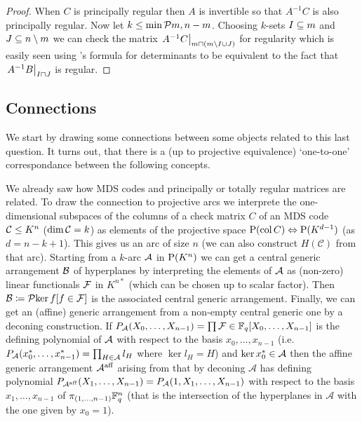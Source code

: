 \begin{proof}
    When $C$ is principally regular then $A$ is invertible so that $A^{-1}C$ is also principally regular. Now let $k\leq \min\set{m,n-m}$. Choosing $k$-sets $I\subseteq m$ and $J\subseteq n\setminus m$ we can check the matrix $\rest{A^{-1}C}_{m\setprod (m\setminus I\setjoin J)}$ for regularity which is easily seen using 's formula for determinants to be equivalent to the fact that $\rest{A^{-1}B}_{I\setprod J}$ is regular.
\end{proof}

\subsection{Connections}

We start by drawing some connections between some objects related to this last question.
It turns out, that there is a (up to projective equivalence) `one-to-one' correspondance between the following concepts.

We already saw how MDS codes and principally or totally regular matrices are related.
To draw the connection to projective arcs we interprete the one-dimensional subspaces of the columns of a check matrix $C$ of an MDS code $\mathcal{C}\leq K^n$ ($\dim\mathcal{C}=k$) as elements of the projective space $\proj(\col C)\iso \P(K^{d-1})$ (as $d=n-k+1$). This gives us an arc of size $n$ (we can also construct $H(\mathcal{C})$ from that arc).
Starting from a $k$-arc $\mathcal{A}$ in $\P(K^n)$ we can get a central generic arrangement $\mathcal{B}$ of hyperplanes by interpreting the elements of $\mathcal{A}$ as (non-zero) linear functionals $\mathcal{F}$ in $K^{n\ast}$ (which can be chosen up to scalar factor). Then $\cB\defeq\set{\ker f}[f\in \cF]$ is the associated central generic arrangement.
Finally, we can get an (affine) generic arrangement from a non-empty central generic one by a deconing construction. If $P_{\mathcal{A}}(X_0,\ldots,X_{n-1})=\prod{\mathcal{F}}\in\mathbb{F}_{q}[X_0,\ldots,X_{n-1}]$ is the defining polynomial of $\mathcal{A}$ with respect to the basis $x_0,\ldots,x_{n-1}$ (i.e. $P_{\mathcal{A}}(x^{\ast}_0,\ldots,x^{\ast}_{n-1})=\prod_{H\in\mathcal{A}}{l_H}$ where $\ker l_H =H$) and $\ker x^{\ast}_0\in\mathcal{A}$ then the affine generic arrangement $\mathcal{A}^{\mathop\mathrm{aff}}$ arising from that by deconing $\mathcal{A}$ has defining polynomial $P_{\mathcal{A}^{\mathop\mathrm{aff}}}(X_1,\ldots,X_{n-1})=P_{\mathcal{A}}(1,X_1,\ldots,X_{n-1})$ with respect to the basis $x_1,\ldots,x_{n-1}$ of $\pi_{(1,\ldots,n-1)}\mathbb{F}_{q}^n$ (that is the intersection of the hyperplanes in $\mathcal{A}$ with the one given by $x_0=1$).

